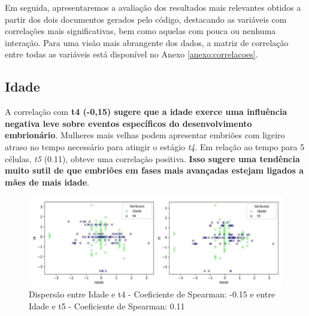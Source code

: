 Em seguida, apresentaremos a avaliação dos resultados mais relevantes obtidos a partir dos dois documentos gerados pelo código, destacando as variáveis com correlações mais significativas, bem como aquelas com pouca ou nenhuma interação. Para uma visão mais abrangente dos dados, a matriz de correlação entre todas as variáveis está disponível no Anexo \ref{anexo:correlacoes}.

\subsection*{Idade}
A correlação com \textbf{t4 (-0,15) sugere que a idade exerce uma influência negativa leve sobre eventos específicos do desenvolvimento embrionário}. Mulheres mais velhas podem apresentar embriões com ligeiro atraso no tempo necessário para atingir o estágio \textit{t4}. Em relação ao tempo para 5 células, \textit{t5} (0.11), obteve uma correlação positiva.\textbf{ Isso sugere uma tendência muito sutil de que embriões em fases mais avançadas estejam ligados a mães de mais idade}.

\begin{figure}[h]
    \captionsetup{font=footnotesize, justification=centering, labelsep=period, position=above}
    \caption{Dispersão entre Idade e t4 - Coeficiente de Spearman: -0.15 e entre Idade e t5 - Coeficiente de Spearman: 0.11}
    \label{fig:idade-t4-t5}
    \centering
    \includegraphics[scale=0.4]{figuras/Spearman/idade-t4-t5.pdf}
    \vspace{0.3cm} 
    \begin{minipage}{\linewidth}
        \centering
    \end{minipage}
\end{figure}
\FloatBarrier 

